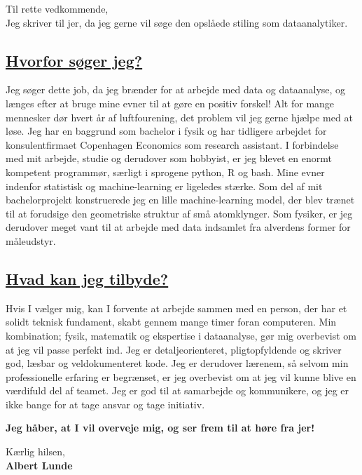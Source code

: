 \subject{Ansøgning som Softwareudvikler ved Centre for Educational Development}
\coverletter[sender=true, vspace=4mm]

Til rette vedkommende,\\

Jeg skriver til jer, da jeg gerne vil søge den opslåede stiling som dataanalytiker. 
\vspace{2mm}
\subsection*{\underline{Hvorfor søger jeg?}}
\vspace{2mm}
Jeg søger dette job, da jeg brænder for at arbejde med data og dataanalyse, og længes efter at bruge mine evner til at gøre en positiv forskel! Alt for mange mennesker dør hvert år af luftfourening, det problem vil jeg gerne hjælpe med at løse. Jeg har en baggrund som bachelor i fysik og har tidligere arbejdet for konsulentfirmaet Copenhagen Economics som research assistant. I forbindelse med mit arbejde, studie og derudover som hobbyist, er jeg blevet en enormt kompetent programmør, særligt i sprogene python, R og bash. Mine evner indenfor statistisk og machine-learning er ligeledes stærke. Som del af mit bachelorprojekt konstruerede jeg en lille machine-learning model, der blev trænet til at forudsige den geometriske struktur af små atomklynger. Som fysiker, er jeg derudover meget vant til at arbejde med data indsamlet fra alverdens former for måleudstyr. 
\subsection*{\underline{Hvad kan jeg tilbyde?}}
\vspace{2mm}
Hvis I vælger mig, kan I forvente at arbejde sammen med en person, der har et solidt teknisk fundament, skabt gennem mange timer foran computeren. Min kombination; fysik, matematik og ekspertise i dataanalyse, gør mig overbevist om at jeg vil passe perfekt ind. Jeg er detaljeorienteret, pligtopfyldende og skriver god, læsbar og veldokumenteret kode. Jeg er derudover lærenem, så selvom min professionelle erfaring er begrænset, er jeg overbevist om at jeg vil kunne blive en værdifuld del af teamet. Jeg er god til at samarbejde og kommunikere, og jeg er ikke bange for at tage ansvar og tage initiativ. 

\vspace*{5mm}
\centerline{\textbf{Jeg håber, at I vil overveje mig, og ser frem til at høre fra jer!}}
\vspace*{5mm}

Kærlig hilsen, \\

\textbf{Albert Lunde}
